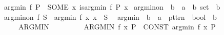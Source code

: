 \begin{isabellebody}
{\isachardoublequoteopen}arg{\isacharunderscore}{\kern0pt}min\ f\ P\ {\isacharequal}{\kern0pt}\ {\isacharparenleft}{\kern0pt}SOME\ x{\isachardot}{\kern0pt}\ is{\isacharunderscore}{\kern0pt}arg{\isacharunderscore}{\kern0pt}min\ f\ P\ x{\isacharparenright}{\kern0pt}{\isachardoublequoteclose}\isanewline
\isanewline
{}\isamarkupfalse%
\ arg{\isacharunderscore}{\kern0pt}min{\isacharunderscore}{\kern0pt}on\ {\isacharcolon}{\kern0pt}{\isacharcolon}{\kern0pt}\ {\isachardoublequoteopen}{\isacharparenleft}{\kern0pt}{\isacharprime}{\kern0pt}b\ {\isasymRightarrow}\ {\isacharprime}{\kern0pt}a{\isacharparenright}{\kern0pt}\ {\isasymRightarrow}\ {\isacharprime}{\kern0pt}b\ set\ {\isasymRightarrow}\ {\isacharprime}{\kern0pt}b{\isachardoublequoteclose}\ \isanewline
{\isachardoublequoteopen}arg{\isacharunderscore}{\kern0pt}min{\isacharunderscore}{\kern0pt}on\ f\ S\ {\isacharequal}{\kern0pt}\ arg{\isacharunderscore}{\kern0pt}min\ f\ {\isacharparenleft}{\kern0pt}{\isasymlambda}x{\isachardot}{\kern0pt}\ x\ {\isasymin}\ S{\isacharparenright}{\kern0pt}{\isachardoublequoteclose}\isanewline
\isanewline
{}\isamarkupfalse%
\isanewline
\isanewline
{}\isamarkupfalse%
\isanewline
\ \ {\isachardoublequoteopen}{\isacharunderscore}{\kern0pt}arg{\isacharunderscore}{\kern0pt}min{\isachardoublequoteclose}\ {\isacharcolon}{\kern0pt}{\isacharcolon}{\kern0pt}\ {\isachardoublequoteopen}{\isacharparenleft}{\kern0pt}{\isacharprime}{\kern0pt}b\ {\isasymRightarrow}\ {\isacharprime}{\kern0pt}a{\isacharparenright}{\kern0pt}\ {\isasymRightarrow}\ pttrn\ {\isasymRightarrow}\ bool\ {\isasymRightarrow}\ {\isacharprime}{\kern0pt}b{\isachardoublequoteclose}\isanewline
\ \ \ \ {\isacharparenleft}{\kern0pt}{\isachardoublequoteopen}{\isacharparenleft}{\kern0pt}{}ARG{\isacharprime}{\kern0pt}{\isacharunderscore}{\kern0pt}MIN\ {\isacharunderscore}{\kern0pt}\ {\isacharunderscore}{\kern0pt}{\isachardot}{\kern0pt}{\isacharslash}{\kern0pt}\ {\isacharunderscore}{\kern0pt}{\isacharparenright}{\kern0pt}{\isachardoublequoteclose}\ {\isacharbrackleft}{\kern0pt}{}{}{}{}{\isacharcomma}{\kern0pt}\ {}{\isacharcomma}{\kern0pt}\ {}{}{\isacharbrackright}{\kern0pt}\ {}{}{\isacharparenright}{\kern0pt}\isanewline
{}\isamarkupfalse%
\isanewline
\ \ {\isachardoublequoteopen}ARG{\isacharunderscore}{\kern0pt}MIN\ f\ x{\isachardot}{\kern0pt}\ P{\isachardoublequoteclose}\ {\isasymrightleftharpoons}\ {\isachardoublequoteopen}CONST\ arg{\isacharunderscore}{\kern0pt}min\ f\ {\isacharparenleft}{\kern0pt}{\isasymlambda}x{\isachardot}{\kern0pt}\ P{\isacharparenright}{\kern0pt}{\isachardoublequoteclose}\isanewline

\end{isabellebody}
